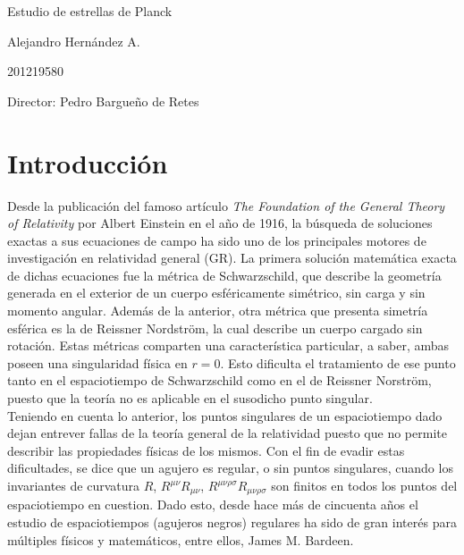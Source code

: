 \documentclass{article}
\numberwithin{equation}{section}
\begin{document}
\begin{center}
\Huge
Estudio de estrellas de Planck 

\vspace{3mm}
\Large Alejandro Hernández A.

\large
201219580


\vspace{2mm}
\Large
Director: Pedro Bargueño de Retes

\normalsize
\vspace{2mm}

\date{}
\end{center}


\normalsize
\section{Introducción}

Desde la publicación del famoso artículo \textit{The Foundation of the General Theory of Relativity} \cite{einstein} por Albert Einstein en el año de 1916, la búsqueda de soluciones exactas a sus ecuaciones de campo ha sido uno de los principales motores de investigación en relatividad general (GR). La primera solución matemática exacta de dichas ecuaciones fue la métrica de Schwarzschild, que describe la geometría generada en el exterior de un cuerpo esféricamente simétrico, sin carga y sin momento angular. Además de la anterior, otra métrica que presenta simetría esférica es la de Reissner Nordström, la cual describe un cuerpo cargado sin rotación. Estas métricas comparten una característica particular, a saber, ambas poseen una singularidad física en $r = 0$. Esto dificulta el tratamiento de ese punto tanto en el espaciotiempo de Schwarzschild como en el de Reissner Norström, puesto que la teoría no es aplicable en el susodicho punto singular.\\

Teniendo en cuenta lo anterior, los puntos singulares de un espaciotiempo dado dejan entrever fallas de la teoría general de la relatividad puesto que no permite describir las propiedades físicas de los mismos. Con el fin de evadir estas dificultades, se dice que un agujero es regular, o sin puntos singulares, cuando los invariantes de curvatura $R$, $R^{\mu \nu}R_{\mu \nu}$, $R^{\mu \nu \rho \sigma}R_{\mu \nu \rho \sigma}$ son finitos en todos los puntos del espaciotiempo en cuestion. Dado esto, desde hace más de cincuenta años el estudio de espaciotiempos (agujeros negros) regulares ha sido de gran interés para múltiples físicos y matemáticos, entre ellos, James M. Bardeen. \\
\end{document}
